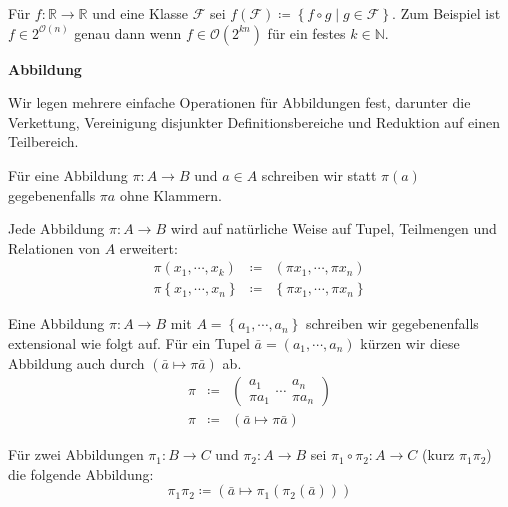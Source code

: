 \begin{defn}
Für $f:\mathbb{R}\rightarrow\mathbb{R}$ und eine Klasse $\mathcal{F}$
sei $f\left(\mathcal{F}\right)\coloneqq\left\{ f\circ g\mid g\in\mathcal{F}\right\} $.
Zum Beispiel ist $f\in2^{\mathcal{O}\left(n\right)}$ genau dann wenn
$f\in\mathcal{O}\left(2^{kn}\right)$ für ein festes $k\in\mathbb{N}$.
\end{defn}
%
\begin{defn}
\textbf{Abbildung}

Wir legen mehrere einfache Operationen für Abbildungen fest, darunter
die Verkettung, Vereinigung disjunkter Definitionsbereiche und Reduktion
auf einen Teilbereich.

Für eine Abbildung $\pi:A\rightarrow B$ und $a\in A$ schreiben wir
statt $\pi\left(a\right)$ gegebenenfalls $\pi a$ ohne Klammern.

Jede Abbildung $\pi:A\rightarrow B$ wird auf natürliche Weise auf
Tupel, Teilmengen und Relationen von $A$ erweitert:
\begin{eqnarray*}
\pi\left(x_{1},\cdots,x_{k}\right) & \coloneqq & \left(\pi x_{1},\cdots,\pi x_{n}\right)\\
\pi\left\{ x_{1},\cdots,x_{n}\right\}  & \coloneqq & \left\{ \pi x_{1},\cdots,\pi x_{n}\right\} 
\end{eqnarray*}

Eine Abbildung $\pi:A\rightarrow B$ mit $A=\left\{ a_{1},\cdots,a_{n}\right\} $
schreiben wir gegebenenfalls extensional wie folgt auf. Für ein Tupel
$\bar{a}=\left(a_{1},\cdots,a_{n}\right)$ kürzen wir diese Abbildung
auch durch $\left(\bar{a}\mapsto\pi\bar{a}\right)$ ab. 
\begin{eqnarray*}
\pi & \coloneqq & \left(\begin{array}{c}
a_{1}\\
\pi a_{1}
\end{array}\cdots\begin{array}{c}
a_{n}\\
\pi a_{n}
\end{array}\right)\\
\pi & \coloneqq & \left(\bar{a}\mapsto\pi\bar{a}\right)
\end{eqnarray*}

Für zwei Abbildungen $\pi_{1}:B\rightarrow C$ und $\pi_{2}:A\rightarrow B$
sei $\pi_{1}\circ\pi_{2}:A\rightarrow C$ (kurz $\pi_{1}\pi_{2}$)
die folgende Abbildung: 
\[
\pi_{1}\pi_{2}\coloneqq\left(\bar{a}\mapsto\pi_{1}\left(\pi_{2}\left(\bar{a}\right)\right)\right)
\]


\end{defn}
